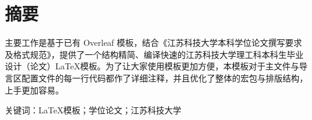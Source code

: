 \chapter*{\texorpdfstring{摘\quad 要}{摘要}}

{\songti\fontsize{12pt}{20pt}\selectfont
主要工作是基于已有 Overleaf 模板，结合《江苏科技大学本科学位论文撰写要求及格式规范》，提供了一个结构精简、编译快速的江苏科技大学理工科本科生毕业设计（论文）\LaTeX 模板。为了让大家使用模板更加方便，本模板对于主文件与导言区配置文件的每一行代码都作了详细注释，并且优化了整体的宏包与排版结构，上手更加容易。
}

\par\vspace{\baselineskip}
\noindent
{\heiti{}关键词：}{\songti{}\LaTeX 模板；学位论文；江苏科技大学}

\clearpage
